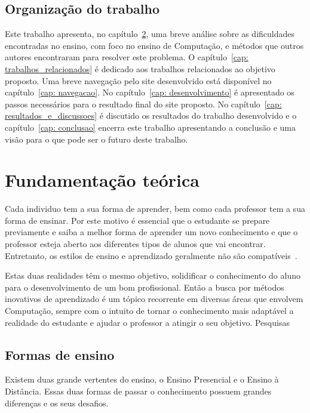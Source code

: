 \documentclass[tcc,capa]{texufpel}
\begin{document}
\section{Organização do trabalho}

Este trabalho apresenta, no capítulo~\ref{cap: fundamentacao_teorica}, uma breve análise sobre as dificuldades encontradas no ensino, com foco no ensino de Computação, e métodos que outros autores encontraram para resolver este problema. O capítulo~\ref{cap: trabalhos_relacionados} é dedicado aos trabalhos relacionados ao objetivo proposto. Uma breve navegação pelo site desenvolvido está disponível no capítulo~\ref{cap: navegacao}. No capítulo~\ref{cap: desenvolvimento} é apresentado os passos necessários para o resultado final do site proposto. No capítulo~\ref{cap: resultados_e_discussoes} é discutido os resultados do trabalho desenvolvido e o capítulo~\ref{cap: conclusao} encerra este trabalho apresentando a conclusão e uma visão para o que pode ser o futuro deste trabalho.

\chapter{Fundamentação teórica}
\label{cap: fundamentacao_teorica}

Cada individuo tem a sua forma de aprender, bem como cada professor tem a sua forma de ensinar. Por este motivo é essencial que o estudante se prepare previamente e saiba a melhor forma de aprender um novo conhecimento e que o professor esteja aberto aos diferentes tipos de alunos que vai encontrar. Entretanto, os estilos de ensino e aprendizado geralmente não são compatíveis~\cite{felder1988learning}.

Estas duas realidades têm o mesmo objetivo, solidificar o conhecimento do aluno para o desenvolvimento de um bom profissional. Então a busca por métodos inovativos de aprendizado é um tópico recorrente em diversas áreas que envolvem Computação, sempre com o intuito de tornar o conhecimento mais adaptável a realidade do estudante e ajudar o professor a atingir o seu objetivo. Pesquisas  ~\cite{drachsler2015panorama} ~\cite{aguiar2018recomendaccao}

\section{Formas de ensino}

Existem duas grande vertentes do ensino, o Ensino Presencial e o Ensino à Distância. Essas duas formas de passar o conhecimento possuem grandes diferenças e os seus desafios. 
\end{document}
